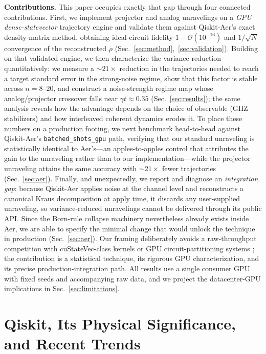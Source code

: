 \documentclass{ieeeaccess}
\begin{document}
\textbf{Contributions.} This paper occupies exactly that gap through four connected contributions.
First, we implement projector and analog unravelings on a \emph{GPU dense-statevector} trajectory engine
and validate them against Qiskit-Aer's exact density-matrix method, obtaining ideal-circuit fidelity
$1-\mathcal{O}(10^{-16})$ and $1/\sqrt{N}$ convergence of the reconstructed $\rho$
(Sec.~\ref{sec:method},~\ref{sec:validation}). Building on that validated engine, we then characterize
the variance reduction quantitatively: we measure a $\sim\!21\times$ reduction in the trajectories needed
to reach a target standard error in the strong-noise regime, show that this factor is stable across
$n=8$--$20$, and construct a noise-strength regime map whose analog/projector crossover falls near
$\gamma t\approx0.35$ (Sec.~\ref{sec:results}); the same analysis reveals how the advantage depends on the
choice of observable (GHZ stabilizers) and how interleaved coherent dynamics erodes it. To place these
numbers on a production footing, we next benchmark head-to-head against Qiskit-Aer's
\texttt{batched\_\allowbreak shots\_\allowbreak gpu} path, verifying that our standard unraveling is statistically identical to
Aer's---an apples-to-apples control that attributes the gain to the unraveling rather than to our
implementation---while the projector unraveling attains the same accuracy with $\sim\!21\times$ fewer
trajectories (Sec.~\ref{sec:aer}). Finally, and unexpectedly, we report and diagnose an \emph{integration
gap}: because Qiskit-Aer applies noise at the channel level and reconstructs a canonical Kraus
decomposition at apply time, it discards any user-supplied unraveling, so variance-reduced unravelings
cannot be delivered through its public API. Since the Born-rule collapse machinery nevertheless already
exists inside Aer, we are able to specify the minimal change that would unlock the technique in
production (Sec.~\ref{sec:aer}).
Our framing deliberately avoids a raw-throughput competition with cuStateVec-class kernels
\cite{cuquantum2023} or GPU circuit-partitioning systems \cite{atlas_sc24,questab_ics25};
the contribution is a statistical technique, its rigorous GPU characterization, and its
precise production-integration path. All results use a single consumer GPU with fixed seeds
and accompanying raw data, and we project the datacenter-GPU implications in
Sec.~\ref{sec:limitations}.

\section{Qiskit, Its Physical Significance, and Recent Trends}\label{sec:qiskit}
\end{document}
